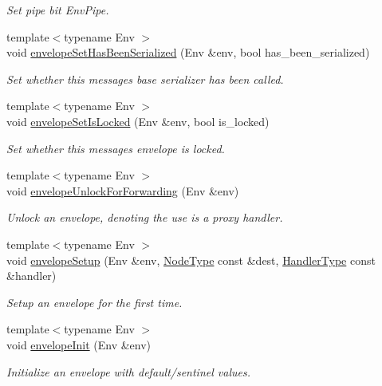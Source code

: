 \begin{DoxyCompactItemize}
\begin{DoxyCompactList}\small\item\em Set pipe bit {\ttfamily Env\+Pipe}. \end{DoxyCompactList}\item 
{\footnotesize template$<$typename Env $>$ }\\void \hyperlink{namespacevt_a32c449c2c4c6e0806cdab6798e275c03}{envelope\+Set\+Has\+Been\+Serialized} (Env \&env, bool has\+\_\+been\+\_\+serialized)
\begin{DoxyCompactList}\small\item\em Set whether this message\textquotesingle{}s base serializer has been called. \end{DoxyCompactList}\item 
{\footnotesize template$<$typename Env $>$ }\\void \hyperlink{namespacevt_aeda768e2b7668340d73e5254a6b2923f}{envelope\+Set\+Is\+Locked} (Env \&env, bool is\+\_\+locked)
\begin{DoxyCompactList}\small\item\em Set whether this message\textquotesingle{}s envelope is locked. \end{DoxyCompactList}\item 
{\footnotesize template$<$typename Env $>$ }\\void \hyperlink{namespacevt_af3b1b3751353bac014e08070383062e9}{envelope\+Unlock\+For\+Forwarding} (Env \&env)
\begin{DoxyCompactList}\small\item\em Unlock an envelope, denoting the use is a proxy handler. \end{DoxyCompactList}\item 
{\footnotesize template$<$typename Env $>$ }\\void \hyperlink{namespacevt_a342e0012cb5a73a61a2e1619451c5898}{envelope\+Setup} (Env \&env, \hyperlink{namespacevt_a866da9d0efc19c0a1ce79e9e492f47e2}{Node\+Type} const \&dest, \hyperlink{namespacevt_af64846b57dfcaf104da3ef6967917573}{Handler\+Type} const \&handler)
\begin{DoxyCompactList}\small\item\em Setup an envelope for the first time. \end{DoxyCompactList}\item 
{\footnotesize template$<$typename Env $>$ }\\void \hyperlink{namespacevt_a26b669aa49c2c9fa4a0fb88902518adb}{envelope\+Init} (Env \&env)
\begin{DoxyCompactList}\small\item\em Initialize an envelope with default/sentinel values. \end{DoxyCompactList}\item 

\end{DoxyCompactItemize}
